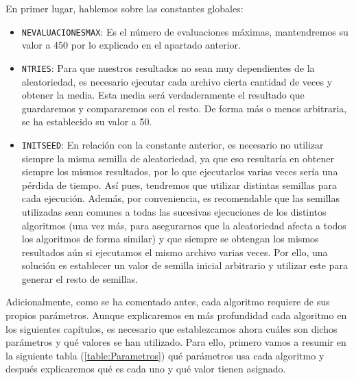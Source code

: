 En primer lugar, hablemos sobre las constantes globales:
\begin{itemize}
	\item \texttt{NEVALUACIONESMAX}: Es el número de evaluaciones máximas, mantendremos su valor a 450 por lo explicado en el apartado anterior. 
	\item \texttt{NTRIES}: Para que nuestros resultados no sean muy dependientes de la aleatoriedad, es necesario ejecutar cada archivo cierta cantidad de veces y obtener la media. 
Esta media será verdaderamente el resultado que guardaremos y compararemos con el resto. 
De forma más o menos arbitraria, se ha establecido su valor a 50.
	\item \texttt{INITSEED}: En relación con la constante anterior, es necesario no utilizar siempre la misma semilla de aleatoriedad, ya que eso resultaría en obtener siempre los mismos resultados, por lo que ejecutarlos varias veces sería una pérdida de tiempo. 
Así pues, tendremos que utilizar distintas semillas para cada ejecución. 
Además, por conveniencia, es recomendable que las semillas utilizadas sean comunes a todas las sucesivas ejecuciones de los distintos algoritmos (una vez más, para asegurarnos que la aleatoriedad afecta a todos los algoritmos de forma similar) y que siempre se obtengan los mismos resultados aún si ejecutamos el mismo archivo varias veces. 
Por ello, una solución es establecer un valor de semilla inicial arbitrario y utilizar este para generar el resto de semillas.
\end{itemize}

Adicionalmente, como se ha comentado antes, cada algoritmo requiere de sus propios parámetros. 
Aunque explicaremos en más profundidad cada algoritmo en los siguientes capítulos, es necesario que establezcamos ahora cuáles son dichos parámetros y qué valores se han utilizado. 
Para ello, primero vamos a resumir en la siguiente tabla (\ref{table:Parametros}) qué parámetros usa cada algoritmo y después explicaremos qué es cada uno y qué valor tienen asignado.

